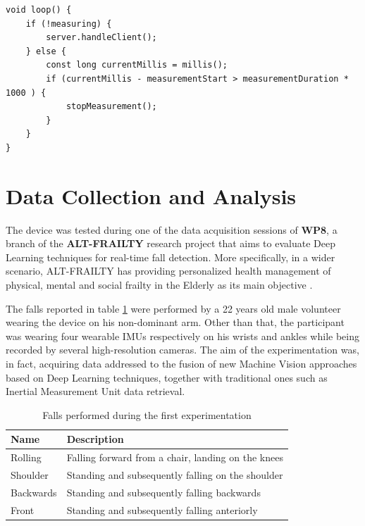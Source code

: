 \begin{verbatim}
void loop() {
    if (!measuring) {
        server.handleClient();
    } else {
        const long currentMillis = millis();
        if (currentMillis - measurementStart > measurementDuration * 1000 ) {
            stopMeasurement();
        }
    }
}
\end{verbatim}

\pagebreak

\section{Data Collection and Analysis}\label{sec:data-collection}


The device was tested during one of the data acquisition sessions of \textbf{WP8}, a branch of the \textbf{ALT-FRAILTY} research project that aims to evaluate Deep Learning techniques for real-time fall detection. More specifically, in a wider scenario, ALT-FRAILTY has providing personalized health management of physical, mental and social frailty in the Elderly as its main objective \cite{altfrailty}.

The falls reported in table \ref{toc:bitalino-falls} were performed by a 22 years old male volunteer wearing the device on his non-dominant arm. Other than that, the participant was wearing four wearable IMUs respectively on his wrists and ankles while being recorded by several high-resolution cameras. The aim of the experimentation was, in fact, acquiring data addressed to the fusion of new Machine Vision approaches based on Deep Learning techniques, together with traditional ones such as Inertial Measurement Unit data retrieval.

\vspace{7mm}

\begin{table}[H]
\centering
\begin{tabular}{ll}
    \hline
    Name            &  Description           \\
    \hline
    Rolling         & Falling forward from a chair, landing on the knees \\
    Shoulder        & Standing and subsequently falling on the shoulder \\
    Backwards       & Standing and subsequently falling backwards \\
    Front           & Standing and subsequently falling anteriorly \\
    \hline
\end{tabular}
\caption{Falls performed during the first experimentation}
\label{toc:bitalino-falls}
\end{table}

